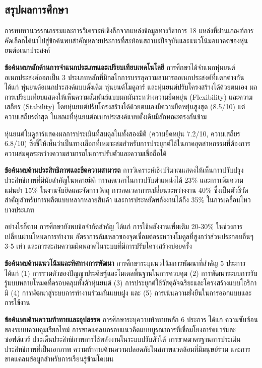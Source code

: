 \documentclass[a4paper]{article}
\begin{document}
\subsection{สรุปผลการศึกษา}

การทบทวนวรรณกรรมและการวิเคราะห์เชิงลึกจากแหล่งข้อมูลทางวิชาการ 18 แหล่งที่ผ่านเกณฑ์การคัดเลือกได้นำไปสู่ข้อค้นพบสำคัญหลายประการที่สะท้อนสถานะปัจจุบันและแนวโน้มอนาคตของหุ่นยนต์อเนกประสงค์

\textbf{ข้อค้นพบหลักด้านการจำแนกประเภทและเปรียบเทียบเทคโนโลยี} การศึกษาได้จำแนกหุ่นยนต์อเนกประสงค์ออกเป็น 3 ประเภทหลักที่มีกลไกการบรรลุความสามารถอเนกประสงค์ที่แตกต่างกัน ได้แก่ หุ่นยนต์อเนกประสงค์แบบดั้งเดิม หุ่นยนต์โมดูลาร์ และหุ่นยนต์ปรับโครงสร้างได้ด้วยตนเอง ผลการเปรียบเทียบแสดงให้เห็นความสัมพันธ์แบบผกผันระหว่างความยืดหยุ่น (Flexibility) และความเสถียร (Stability) โดยหุ่นยนต์ปรับโครงสร้างได้ด้วยตนเองมีความยืดหยุ่นสูงสุด (8.5/10) แต่ความเสถียรต่ำสุด ในขณะที่หุ่นยนต์อเนกประสงค์แบบดั้งเดิมมีลักษณะตรงกันข้าม

หุ่นยนต์โมดูลาร์แสดงผลการประเมินที่สมดุลในทั้งสองมิติ (ความยืดหยุ่น 7.2/10, ความเสถียร 6.8/10) ซึ่งชี้ให้เห็นว่าเป็นทางเลือกที่เหมาะสมสำหรับการประยุกต์ใช้ในภาคอุตสาหกรรมที่ต้องการความสมดุลระหว่างความสามารถในการปรับตัวและความเชื่อถือได้

\textbf{ข้อค้นพบด้านประสิทธิภาพและขีดความสามารถ} การวิเคราะห์เชิงปริมาณแสดงให้เห็นการปรับปรุงประสิทธิภาพที่มีนัยสำคัญในหลายมิติ การลดเวลาในการปรับตำแหน่งได้ 23\% และการเพิ่มความแม่นยำ 15\% ในงานจับยึดและจัดการวัตถุ การลดเวลาการเปลี่ยนระหว่างงาน 40\% ซึ่งเป็นตัวชี้วัดสำคัญสำหรับการผลิตแบบหลากหลายสินค้า และการประหยัดพลังงานได้ถึง 35\% ในการเคลื่อนไหวบางประเภท

อย่างไรก็ตาม การศึกษายังพบข้อจำกัดสำคัญ ได้แก่ การใช้พลังงานเพิ่มเติม 20-30\% ในช่วงการเปลี่ยนผ่านโหมดการทำงาน อัตราการล้มเหลวของจุดเชื่อมต่อระหว่างโมดูลที่สูงกว่าส่วนประกอบอื่นๆ 3-5 เท่า และการสะสมความผิดพลาดในระบบที่มีการปรับโครงสร้างบ่อยครั้ง

\textbf{ข้อค้นพบด้านแนวโน้มและทิศทางการพัฒนา} การศึกษาระบุแนวโน้มการพัฒนาที่สำคัญ 5 ประการ ได้แก่ (1) การรวมตัวของปัญญาประดิษฐ์และโมเดลพื้นฐานในการควบคุม (2) การพัฒนาระบบการรับรู้แบบหลายโหมดที่ครอบคลุมทั้งตัวหุ่นยนต์ (3) การประยุกต์ใช้วัสดุอัจฉริยะและโครงสร้างแบบโอริกามิ (4) การพัฒนาสู่ระบบการทำงานร่วมกันแบบฝูง และ (5) การเน้นความยั่งยืนในการออกแบบและการใช้งาน

\textbf{ข้อค้นพบด้านความท้าทายและอุปสรรค} การศึกษาระบุความท้าทายหลัก 6 ประการ ได้แก่ ความซับซ้อนของระบบควบคุมเรียลไทม์ การขาดแคลนกรอบแนวคิดแบบบูรณาการที่เชื่อมโยงฮาร์ดแวร์และซอฟต์แวร์ ประเด็นประสิทธิภาพการใช้พลังงานในระบบปรับตัวได้ การขาดมาตรฐานการประเมินประสิทธิภาพที่เป็นเอกภาพ ความท้าทายด้านความปลอดภัยในสภาพแวดล้อมที่มีมนุษย์ร่วม และการขาดแคลนข้อมูลสำหรับการเรียนรู้ข้ามโดเมน
\end{document}
